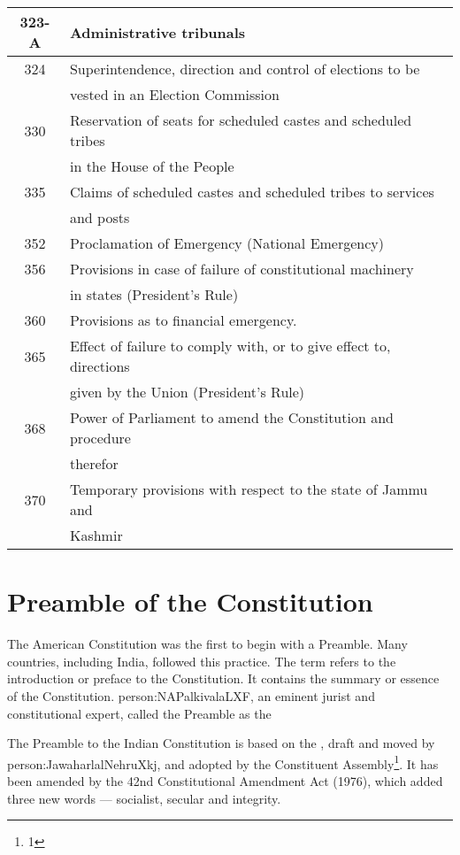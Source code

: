 \begin{longtable}[c]{@{}|c|l|@{}}
  323-A & Administrative tribunals \\ \midrule
  324 & Superintendence, direction and control of elections to be\\
      & vested in an Election Commission \\ \midrule
  330 & Reservation of seats for scheduled castes and scheduled tribes\\
      & in the House of the People \\ \midrule
  335 & Claims of scheduled castes and scheduled tribes to services \\
      & and posts \\ \midrule
  352 & Proclamation of Emergency (National Emergency) \\ \midrule
  356 & Provisions in case of failure of constitutional machinery\\
      &  in states (President’s Rule) \\ \midrule
  360 & Provisions as to financial emergency. \\ \midrule
  365 & Effect of failure to comply with, or to give effect to, directions \\
      & given by the Union (President’s Rule) \\ \midrule
  368 & Power of Parliament to amend the Constitution and procedure \\
      & therefor \\ \midrule
  370 & Temporary provisions with respect to the state of  Jammu and\\
      & Kashmir\\ \midrule
\end{longtable}

\twocolumn
\cleardoublepage

\chapter{Preamble of the Constitution}

The American Constitution was the first to begin with a Preamble. Many countries, including India, followed this practice. The term  refers to the introduction or preface to the Constitution. It contains the summary or essence of the Constitution. \gls{person:NAPalkivalaLXF}, an eminent jurist and constitutional expert, called the Preamble as the 

The Preamble to the Indian Constitution is based on the , draft and moved by \gls{person:JawaharlalNehruXkj}, and adopted by the Constituent Assembly\footnote{1}. It has been amended by the 42nd Constitutional Amendment Act (1976), which added three new words — socialist, secular and integrity.

